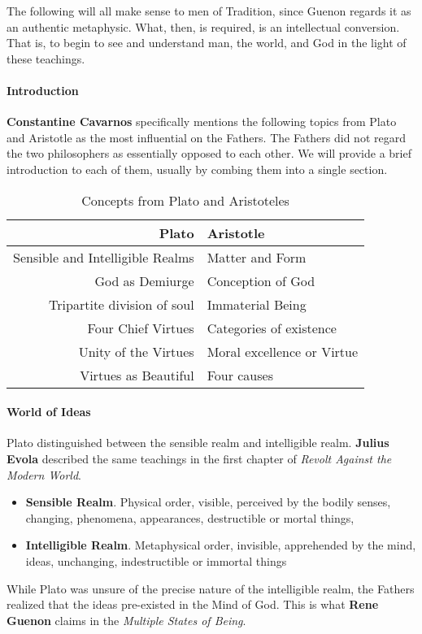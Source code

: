 The following will all make sense to men of Tradition, since Guenon regards it as an authentic metaphysic. What, then, is required, is an intellectual conversion. That is, to begin to see and understand man, the world, and God in the light of these teachings.

\paragraph{Introduction}
\textbf{Constantine Cavarnos} specifically mentions the following topics from Plato and Aristotle as the most influential on the Fathers. The Fathers did not regard the two philosophers as essentially opposed to each other. We will provide a brief introduction to each of them, usually by combing them into a single section.

\begin{table}[h]
\centering
\begin{tabular}{rl}\toprule
\textbf{Plato} & \textbf{Aristotle}\\\midrule
Sensible and Intelligible Realms & Matter and Form\\
God as Demiurge & Conception of God\\
Tripartite division of soul & Immaterial Being\\
Four Chief Virtues & Categories of existence\\
Unity of the Virtues & Moral excellence or Virtue\\
Virtues as Beautiful & Four causes
\\\bottomrule
\end{tabular}
\caption{Concepts from Plato and Aristoteles}
\end{table}

\paragraph{World of Ideas}
Plato distinguished between the sensible realm and intelligible realm. \textbf{Julius Evola} described the same teachings in the first chapter of \emph{Revolt Against the Modern World}.

\begin{itemize}
\item \textbf{Sensible Realm}. Physical order, visible, perceived by the bodily senses, changing, phenomena, appearances, destructible or mortal things, 
\item \textbf{Intelligible Realm}. Metaphysical order, invisible, apprehended by the mind, ideas, unchanging, indestructible or immortal things 
\end{itemize}
While Plato was unsure of the precise nature of the intelligible realm, the Fathers realized that the ideas pre-existed in the Mind of God. This is what \textbf{Rene Guenon} claims in the \emph{Multiple States of Being}.

